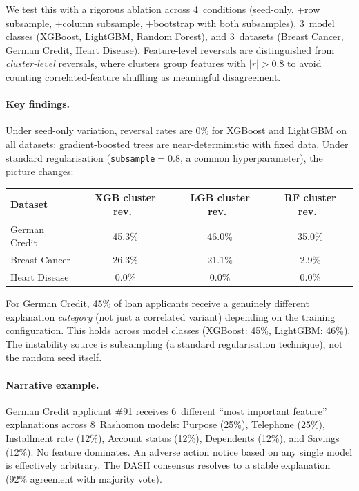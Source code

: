\documentclass[11pt,a4paper]{article}
\begin{document}
We test this with a rigorous ablation across 4~conditions (seed-only, +row subsample, +column subsample, +bootstrap with both subsamples), 3~model classes (XGBoost, LightGBM, Random Forest), and 3~datasets (Breast Cancer, German Credit, Heart Disease). Feature-level reversals are distinguished from \emph{cluster-level} reversals, where clusters group features with $|r| > 0.8$ to avoid counting correlated-feature shuffling as meaningful disagreement.

\paragraph{Key findings.}
Under seed-only variation, reversal rates are 0\% for XGBoost and LightGBM on all datasets: gradient-boosted trees are near-deterministic with fixed data. Under standard regularisation (\texttt{subsample}${}= 0.8$, a common hyperparameter), the picture changes:

\begin{center}
\small
\begin{tabular}{lccc}
\toprule
Dataset & XGB cluster rev.\ & LGB cluster rev.\ & RF cluster rev.\ \\
\midrule
German Credit   & 45.3\% & 46.0\% & 35.0\% \\
Breast Cancer   & 26.3\% & 21.1\% & 2.9\% \\
Heart Disease   & 0.0\%  & 0.0\%  & 0.0\% \\
\bottomrule
\end{tabular}
\end{center}

For German Credit, 45\% of loan applicants receive a genuinely different explanation \emph{category} (not just a correlated variant) depending on the training configuration. This holds across model classes (XGBoost: 45\%, LightGBM: 46\%). The instability source is subsampling (a standard regularisation technique), not the random seed itself.

\paragraph{Narrative example.}
German Credit applicant \#91 receives 6~different ``most important feature'' explanations across 8~Rashomon models: Purpose (25\%), Telephone (25\%), Installment rate (12\%), Account status (12\%), Dependents (12\%), and Savings (12\%). No feature dominates. An adverse action notice based on any single model is effectively arbitrary. The DASH consensus resolves to a stable explanation (92\% agreement with majority vote).
\end{document}
